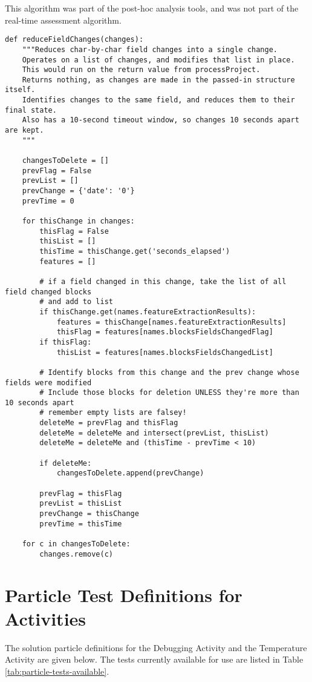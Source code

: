This algorithm was part of the post-hoc analysis tools, and was not part of the real-time assessment algorithm.
\begin{verbatim}
def reduceFieldChanges(changes):
    """Reduces char-by-char field changes into a single change.
    Operates on a list of changes, and modifies that list in place.
    This would run on the return value from processProject.
    Returns nothing, as changes are made in the passed-in structure itself.
    Identifies changes to the same field, and reduces them to their final state.
    Also has a 10-second timeout window, so changes 10 seconds apart are kept.
    """

    changesToDelete = []
    prevFlag = False
    prevList = []
    prevChange = {'date': '0'}
    prevTime = 0

    for thisChange in changes:
        thisFlag = False
        thisList = []
        thisTime = thisChange.get('seconds_elapsed')
        features = []

        # if a field changed in this change, take the list of all field changed blocks 
        # and add to list
        if thisChange.get(names.featureExtractionResults):
            features = thisChange[names.featureExtractionResults]
            thisFlag = features[names.blocksFieldsChangedFlag]
        if thisFlag:
            thisList = features[names.blocksFieldsChangedList]

        # Identify blocks from this change and the prev change whose fields were modified
        # Include those blocks for deletion UNLESS they're more than 10 seconds apart
        # remember empty lists are falsey!
        deleteMe = prevFlag and thisFlag
        deleteMe = deleteMe and intersect(prevList, thisList)
        deleteMe = deleteMe and (thisTime - prevTime < 10)

        if deleteMe:
            changesToDelete.append(prevChange)

        prevFlag = thisFlag
        prevList = thisList
        prevChange = thisChange
        prevTime = thisTime

    for c in changesToDelete:
        changes.remove(c)
\end{verbatim}
\label{src:lst:field-change}

\section{Particle Test Definitions for Activities}
\label{app:particle_definitions}
The solution particle definitions for the Debugging Activity and the Temperature Activity are given below. The tests currently available for use are listed in Table \ref{tab:particle-tests-available}. 

